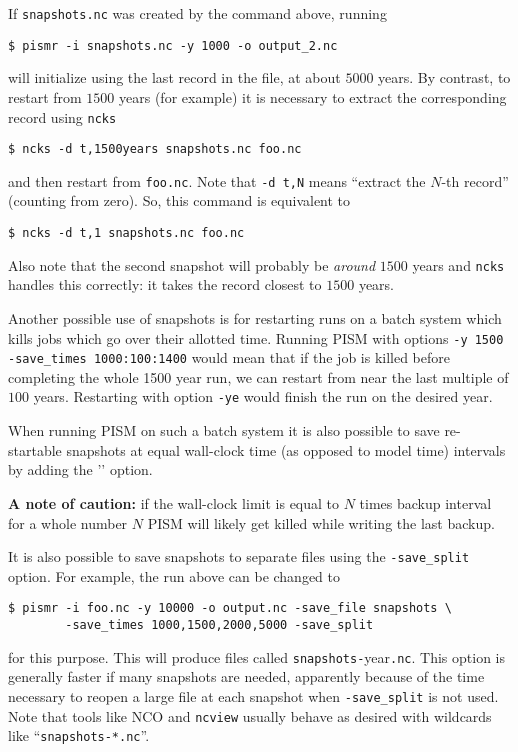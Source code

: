 If \texttt{snapshots.nc} was created by the command above, running
\begin{verbatim}
$ pismr -i snapshots.nc -y 1000 -o output_2.nc
\end{verbatim}
will initialize using the last record in the file, at about $5000$ years.  By contrast, to restart from $1500$ years (for example) it is necessary to extract the corresponding record using \texttt{ncks}
\begin{verbatim}
$ ncks -d t,1500years snapshots.nc foo.nc
\end{verbatim}
and then restart from \texttt{foo.nc}.  Note that \texttt{-d t,N} means ``extract the $N$-th record'' (counting from zero).  So, this command is equivalent to
\begin{verbatim}
$ ncks -d t,1 snapshots.nc foo.nc
\end{verbatim}
Also note that the second snapshot will probably be \emph{around} $1500$ years and \texttt{ncks} handles this correctly: it takes the record closest to $1500$ years.

Another possible use of snapshots is for restarting runs on a batch system which kills jobs which go over their allotted time.  Running PISM with options \texttt{-y 1500} \texttt{-save_times 1000:100:1400} would mean that if the job is killed before completing the whole 1500 year run, we can restart from near the last multiple of $100$ years.  Restarting with option \texttt{-ye} would finish the run on the desired year.

When running PISM on such a batch system it is also possible to save
re-startable snapshots at equal wall-clock time (as opposed to model time)
intervals by adding the '' option.

\textbf{A note of caution:} if the wall-clock limit is equal to $N$ times backup
interval for a whole number $N$ PISM will likely get killed while writing the
last backup.

It is also possible to save snapshots to separate files using the
\texttt{-save_split} option.  For example, the run above can be changed to
\begin{verbatim}
$ pismr -i foo.nc -y 10000 -o output.nc -save_file snapshots \
        -save_times 1000,1500,2000,5000 -save_split
\end{verbatim}
for this purpose.  This will produce files called
\texttt{snapshots-}year\texttt{.nc}.  This option is generally faster if many
snapshots are needed, apparently because of the time necessary to reopen a
large file at each snapshot when \texttt{-save_split} is not used.  Note
that tools like NCO\index{NCO (NetCDF Operators)!wildcards} and
\texttt{ncview} usually behave as desired with wildcards like ``\texttt{snapshots-*.nc}''.


